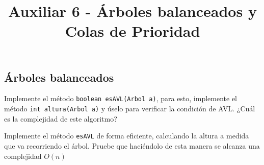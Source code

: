 \documentclass[dcc,sol]{fcfmcourse}
\title{Auxiliar 6 - Árboles balanceados y Colas de Prioridad}
\begin{document}
\maketitle

\vspace{-1ex}

\begin{problems}
\section*{Árboles balanceados}
\problem Implemente el método \texttt{boolean esAVL(Arbol a)}, para esto, implemente el método \texttt{int altura(Arbol a)} y úselo para verificar la condición de AVL. ¿Cuál es la complejidad de este algoritmo?

\problem Implemente el método \texttt{esAVL} de forma eficiente, calculando la altura a medida que va recorriendo el árbol. Pruebe que haciéndolo de esta manera se alcanza una complejidad $O(n)$
\end{problems}
\end{document}
